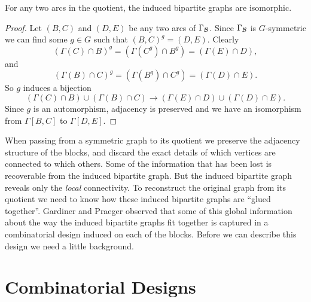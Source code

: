 \begin{proposition}
For any two arcs in the quotient, the induced bipartite graphs are isomorphic.
\begin{proof}
Let $(B,C)$ and $(D,E)$ be any two arcs of $\Gamma_{\mathcal{B}}$.
Since $\Gamma_{\mathcal{B}}$ is $G$-symmetric we can find some $g \in G$
such that $(B,C)^g = (D,E)$. Clearly
$$(\Gamma(C) \cap B)^g = (\Gamma(C^g) \cap B^g) = (\Gamma(E) \cap D),$$
and
$$(\Gamma(B) \cap C)^g = (\Gamma(B^g) \cap C^g) = (\Gamma(D) \cap E).$$
So $g$ induces a bijection
$$(\Gamma(C) \cap B) \cup (\Gamma(B) \cap C)
\to (\Gamma(E) \cap D) \cup (\Gamma(D) \cap E).$$
Since $g$ is an automorphism, adjacency is preserved and we have an isomorphism
from $\Gamma[B,C]$ to $\Gamma[D,E]$.
\end{proof}
\end{proposition}



When passing from a symmetric graph to its quotient
we preserve the adjacency structure of the blocks,
and discard the exact details of which vertices are connected to which others.
Some of the information that has been lost is recoverable from the induced bipartite graph.
But the induced bipartite graph reveals only the {\it local} connectivity.
To reconstruct the original graph from its quotient we need to know
how these induced bipartite graphs are ``glued together''.
Gardiner and Praeger observed that some of this global information about
the way the induced bipartite graphs fit together is captured in a combinatorial design
induced on each of the blocks.
Before we can describe this design we need a little background.



\section{Combinatorial Designs}




